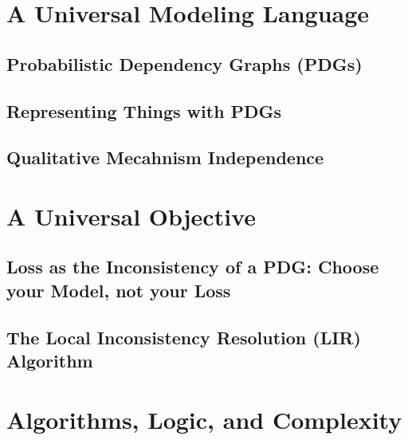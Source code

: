 \documentclass[tocprelim,
    ]{cornellmodified}
\begin{document}
\part{A Universal Modeling Language}

\chapter{Probabilistic Dependency Graphs (PDGs)} 
    
    
\chapter{Representing Things with PDGs}
    
     
\chapter{Qualitative Mecahnism Independence}
    

\part{A Universal Objective}

\chapter{Loss as the Inconsistency of a PDG: 
    Choose your Model, not your Loss}
    
\chapter{ The Local Inconsistency Resolution (LIR) Algorithm }
    \label{chap:lir}
    
\part{Algorithms, Logic, and Complexity%
    }
\end{document}
